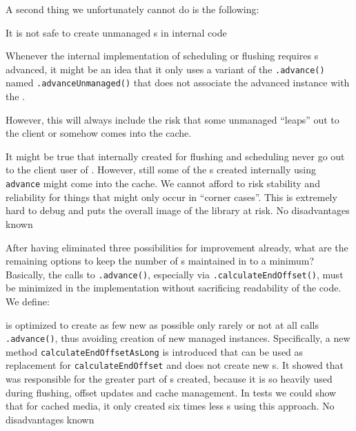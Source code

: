 A second thing we unfortunately cannot do is the following:

{%
It is not safe to create unmanaged \IMediumReference{}s in internal code
}
{%
Whenever the internal implementation of scheduling or flushing requires \IMediumReference{}s advanced, it might be an idea that it only uses a variant of the \IMediumReference{}\texttt{.advance()} named \IMediumReference{}\texttt{.advanceUnmanaged()} that does not associate the advanced \IMediumReference{} instance with the \MediumReferenceRepository{}.

However, this will always include the risk that some unmanaged \IMediumReference{} ``leaps'' out to the client or somehow comes into the cache.
}
{%
It might be true that internally created \IMediumReference{} for flushing and scheduling never go out to the client user of \COMPmedia{}. However, still some of the \IMediumReference{}s created internally using \texttt{advance} might come into the cache. We cannot afford to risk stability and reliability for things that might only occur in ``corner cases''. This is extremely hard to debug and puts the overall image of the library at risk.
}
{%
No disadvantages known
}

After having eliminated three possibilities for improvement already, what are the remaining options to keep the number of \IMediumReference{}s maintained in \MediumReferenceRepository{} to a minimum? Basically, the calls to \IMediumReference{}\texttt{.advance()}, especially via \MediumRegion{}\texttt{.calculateEndOffset()}, must be minimized in the implementation without sacrificing readability of the code. We define:

{%
\MediumRegion{} is optimized to create as few new \IMediumReference{} as possible
}
{%
\MediumRegion{} only rarely or not at all calls \IMediumReference{}\texttt{.advance()}, thus avoiding creation of new managed \IMediumReference{} instances. Specifically, a new method \texttt{calculateEndOffsetAsLong} is introduced that can be used as replacement for \texttt{calculateEndOffset} and does not create new \IMediumReference{}s.
}
{%
It showed that \MediumRegion{} was responsible for the greater part of \IMediumReference{}s created, because it is so heavily used during flushing, offset updates and cache management. In tests we could show that for cached media, it only created six times less \IMediumReference{}s using this approach.
}
{%
No disadvantages known
}

